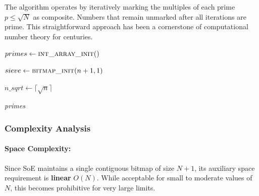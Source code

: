 \documentclass{article}
\begin{document}
The algorithm operates by iteratively marking the multiples of each prime $p \le \sqrt{N}$ as composite. Numbers that remain unmarked after all iterations are prime. This straightforward approach has been a cornerstone of computational number theory for centuries.

\begin{algorithm}[H]
    \caption{Sieve of Eratosthenes (SoE)}
    \begin{algorithmic}[1]        
            \State {}
            \State {} $primes \gets \Call{int\_array\_init}$ 
            \State {} 

            \State {} $sieve \gets \Call{bitmap\_init}{n + 1, 1}$ 

            \State {}
            \State $n\_sqrt \gets \lceil\sqrt{n}\rceil$ 
             
                 
                    \State {} 
                     
                        \State {} 
                    \EndIf
                \EndIf
            \EndFor

            \State {}
            \State \Return \emph{primes}
        \EndProcedure
    \end{algorithmic}
\end{algorithm}

\subsubsection*{Complexity Analysis}

\paragraph{Space Complexity:} Since SoE maintains a single contiguous bitmap of size $N+1$, its auxiliary space requirement is \textbf{linear} $O(N)$. While acceptable for small to moderate values of $N$, this becomes prohibitive for very large limits.
\end{document}
